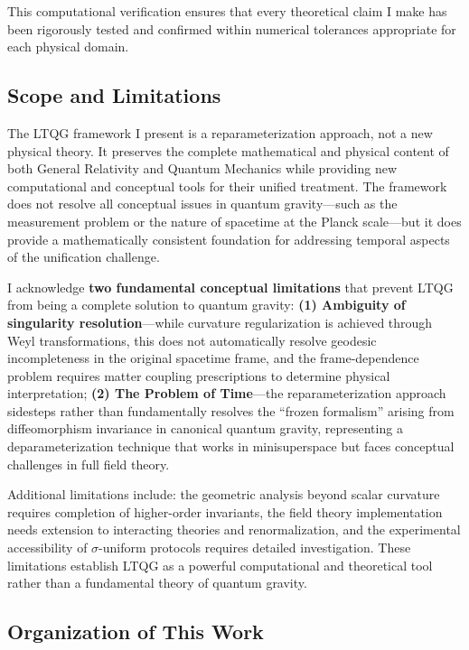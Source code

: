 This computational verification ensures that every theoretical claim I make has been rigorously tested and confirmed within numerical tolerances appropriate for each physical domain.

\subsection{Scope and Limitations}

The LTQG framework I present is a reparameterization approach, not a new physical theory. It preserves the complete mathematical and physical content of both General Relativity and Quantum Mechanics while providing new computational and conceptual tools for their unified treatment. The framework does not resolve all conceptual issues in quantum gravity—such as the measurement problem or the nature of spacetime at the Planck scale—but it does provide a mathematically consistent foundation for addressing temporal aspects of the unification challenge.

I acknowledge \textbf{two fundamental conceptual limitations} that prevent LTQG from being a complete solution to quantum gravity: \textbf{(1) Ambiguity of singularity resolution}—while curvature regularization is achieved through Weyl transformations, this does not automatically resolve geodesic incompleteness in the original spacetime frame, and the frame-dependence problem requires matter coupling prescriptions to determine physical interpretation; \textbf{(2) The Problem of Time}—the reparameterization approach sidesteps rather than fundamentally resolves the ``frozen formalism'' arising from diffeomorphism invariance in canonical quantum gravity, representing a deparameterization technique that works in minisuperspace but faces conceptual challenges in full field theory.

Additional limitations include: the geometric analysis beyond scalar curvature requires completion of higher-order invariants, the field theory implementation needs extension to interacting theories and renormalization, and the experimental accessibility of $\sigma$-uniform protocols requires detailed investigation. These limitations establish LTQG as a powerful computational and theoretical tool rather than a fundamental theory of quantum gravity.

\subsection{Organization of This Work}

